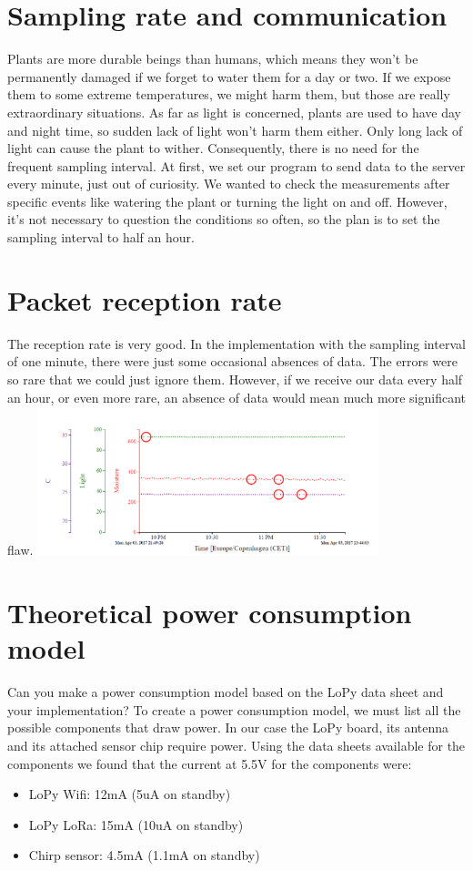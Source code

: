 \documentclass[10pt]{sensys-proc}
\begin{document}
\section{Sampling rate and communication}
Plants are more durable beings than humans, which means they won't be permanently damaged if we forget to water them for a day or two. If we expose them to some extreme temperatures, we might harm them, but those are really extraordinary situations. As far as light is concerned, plants are used to have day and night time, so sudden lack of light won't harm them either. Only long lack of light can cause the plant to wither. Consequently, there is no need for the frequent sampling interval.
At first, we set our program to send data to the server every minute, just out of curiosity. We wanted to check the measurements after specific events like watering the plant or turning the light on and off. However, it's not necessary to question the conditions so often, so the plan is to set the sampling interval to half an hour.
\bigskip
\section{Packet reception rate}
The reception rate is very good. In the implementation with the sampling interval of one minute, there were just some occasional absences of data. The errors were so rare that we could just ignore them. However, if we receive our data every half an hour, or even more rare, an absence of data would mean much more significant flaw.
\includegraphics[height=1.7in]{./Images/figure1}
\section{Theoretical power consumption model}
Can you make a power consumption model based on the LoPy data sheet and
your implementation?
\bigskip
To create a power consumption model, we must list all the possible components that draw power. In our case  the LoPy board, its antenna and its attached sensor chip require power. Using the data sheets available for the components we found that the current at 5.5V for the components were:
\begin{itemize}
  \item LoPy Wifi: 12mA (5uA on standby)
  \item LoPy LoRa: 15mA (10uA on standby)
  \item Chirp sensor: 4.5mA (1.1mA on standby) 
\end{itemize}
\end{document}
